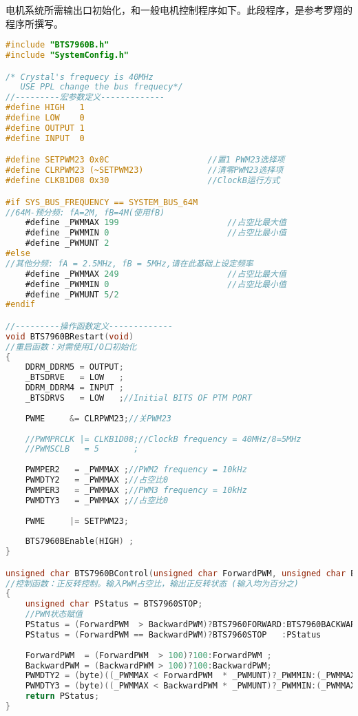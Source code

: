 电机系统所需输出口初始化，和一般电机控制程序如下。此段程序，是参考罗翔的程序所撰写。
\begin{lstlisting}[language={C}, caption={针对BTS7960的单片机初始化程序}]
#include "BTS7960B.h"
#include "SystemConfig.h"

/* Crystal's frequecy is 40MHz
   USE PPL change the bus frequecy*/
//---------宏参数定义-------------
#define HIGH   1
#define LOW    0
#define OUTPUT 1
#define INPUT  0

#define SETPWM23 0x0C                    //置1 PWM23选择项
#define CLRPWM23 (~SETPWM23)             //清零PWM23选择项
#define CLKB1D08 0x30                    //ClockB运行方式

#if SYS_BUS_FREQUENCY == SYSTEM_BUS_64M 
//64M-预分频: fA=2M, fB=4M(使用fB)    
    #define _PWMMAX 199                      //占空比最大值
    #define _PWMMIN 0                        //占空比最小值
    #define _PWMUNT 2    
#else                   
//其他分频: fA = 2.5MHz, fB = 5MHz,请在此基础上设定频率 
    #define _PWMMAX 249                      //占空比最大值
    #define _PWMMIN 0                        //占空比最小值 
    #define _PWMUNT 5/2   
#endif   

//---------操作函数定义-------------
void BTS7960BRestart(void)     
//重启函数：对需使用I/O口初始化
{
    DDRM_DDRM5 = OUTPUT;
    _BTSDRVE   = LOW   ;
    DDRM_DDRM4 = INPUT ;
    _BTSDRVS   = LOW   ;//Initial BITS OF PTM PORT 
    
    PWME     &= CLRPWM23;//关PWM23 
    
    //PWMPRCLK |= CLKB1D08;//ClockB frequency = 40MHz/8=5MHz
    //PWMSCLB   = 5       ;
    
    PWMPER2   = _PWMMAX ;//PWM2 frequency = 10kHz
    PWMDTY2   = _PWMMAX ;//占空比0 
    PWMPER3   = _PWMMAX ;//PWM3 frequency = 10kHz
    PWMDTY3   = _PWMMAX ;//占空比0    
    
    PWME     |= SETPWM23;
    
    BTS7960BEnable(HIGH) ;   
}

unsigned char BTS7960BControl(unsigned char ForwardPWM, unsigned char BackwardPWM)
//控制函数：正反转控制。输入PWM占空比，输出正反转状态 (输入均为百分之)
{
    unsigned char PStatus = BTS7960STOP;
    //PWM状态赋值
    PStatus = (ForwardPWM  > BackwardPWM)?BTS7960FORWARD:BTS7960BACKWARD;//电机运行状态判断
    PStatus = (ForwardPWM == BackwardPWM)?BTS7960STOP   :PStatus        ;
    
    ForwardPWM  = (ForwardPWM  > 100)?100:ForwardPWM ;
    BackwardPWM = (BackwardPWM > 100)?100:BackwardPWM;
    PWMDTY2 = (byte)((_PWMMAX < ForwardPWM  * _PWMUNT)?_PWMMIN:(_PWMMAX - ForwardPWM *_PWMUNT));//计算PWM占空比
    PWMDTY3 = (byte)((_PWMMAX < BackwardPWM * _PWMUNT)?_PWMMIN:(_PWMMAX - BackwardPWM*_PWMUNT));
    return PStatus;
}              
\end{lstlisting}
